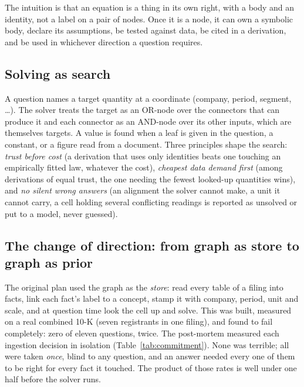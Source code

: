 

The intuition is that an equation is a thing in its own right, with a body and an identity, not a label on a pair of nodes. Once it is a node, it can own a symbolic body, declare its assumptions, be tested against data, be cited in a derivation, and be used in whichever direction a question requires.

\subsection{Solving as search}

A question names a target quantity at a coordinate (company, period, segment, \ldots). The solver treats the target as an OR-node over the connectors that can produce it and each connector as an AND-node over its other inputs, which are themselves targets. A value is found when a leaf is given in the question, a constant, or a figure read from a document. Three principles shape the search: \emph{trust before cost} (a derivation that uses only identities beats one touching an empirically fitted law, whatever the cost), \emph{cheapest data demand first} (among derivations of equal trust, the one needing the fewest looked-up quantities wins), and \emph{no silent wrong answers} (an alignment the solver cannot make, a unit it cannot carry, a cell holding several conflicting readings is reported as unsolved or put to a model, never guessed).

\subsection{The change of direction: from graph as store to graph as prior}
\label{sec:idea-pivot}

The original plan used the graph as the \emph{store}: read every table of a filing into facts, link each fact's label to a concept, stamp it with company, period, unit and scale, and at question time look the cell up and solve. This was built, measured on a real combined 10-K (seven registrants in one filing), and found to fail completely: zero of eleven questions, twice. The post-mortem measured each ingestion decision in isolation (Table~\ref{tab:commitment}). None was terrible; all were taken \emph{once}, blind to any question, and an answer needed every one of them to be right for every fact it touched. The product of those rates is well under one half before the solver runs.


